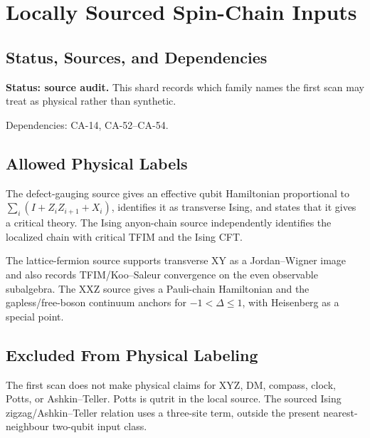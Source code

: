 
\section{Locally Sourced Spin-Chain Inputs}
\label{sec:qubit-sourced-spin-chain-families}

\subsection{Status, Sources, and Dependencies}

\textbf{Status: source audit.}  This shard records which family names the first
scan may treat as physical rather than synthetic.

Dependencies: CA-14, CA-52--CA-54.


\subsection{Allowed Physical Labels}

The defect-gauging source gives an effective qubit Hamiltonian proportional to
\(\sum_i(I+Z_iZ_{i+1}+X_i)\), identifies it as transverse Ising, and states
that it gives a critical theory.  The Ising anyon-chain source independently
identifies the localized chain with critical TFIM and the Ising CFT.

The lattice-fermion source supports transverse XY as a Jordan--Wigner image and
also records TFIM/Koo--Saleur convergence on the even observable subalgebra.
The XXZ source gives a Pauli-chain Hamiltonian and the gapless/free-boson
continuum anchors for \(-1<\Delta\le1\), with Heisenberg as a special point.

\subsection{Excluded From Physical Labeling}

The first scan does not make physical claims for XYZ, DM, compass, clock, Potts,
or Ashkin--Teller.  Potts is qutrit in the local source.  The sourced Ising
zigzag/Ashkin--Teller relation uses a three-site term, outside the present
nearest-neighbour two-qubit input class.
